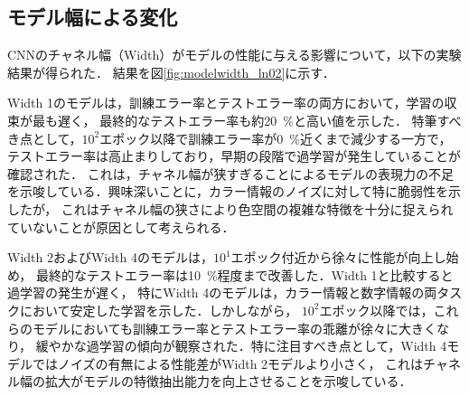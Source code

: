 \newpage

\subsection{モデル幅による変化}

CNNのチャネル幅（Width）がモデルの性能に与える影響について，以下の実験結果が得られた．
結果を図\ref{fig:modelwidth_ln02}に示す．

Width 1のモデルは，訓練エラー率とテストエラー率の両方において，学習の収束が最も遅く，
最終的なテストエラー率も約\SI{20}{\percent}と高い値を示した．
特筆すべき点として，$10^2$エポック以降で訓練エラー率が\SI{0}{\percent}近くまで減少する一方で，
テストエラー率は高止まりしており，早期の段階で過学習が発生していることが確認された．
これは，チャネル幅が狭すぎることによるモデルの表現力の不足を示唆している．興味深いことに，カラー情報のノイズに対して特に脆弱性を示したが，
これはチャネル幅の狭さにより色空間の複雑な特徴を十分に捉えられていないことが原因として考えられる．

Width 2およびWidth 4のモデルは，$10^1$エポック付近から徐々に性能が向上し始め，
最終的なテストエラー率は\SI{10}{\percent}程度まで改善した．Width 1と比較すると過学習の発生が遅く，
特にWidth 4のモデルは，カラー情報と数字情報の両タスクにおいて安定した学習を示した．しかしながら，
$10^2$エポック以降では，これらのモデルにおいても訓練エラー率とテストエラー率の乖離が徐々に大きくなり，
緩やかな過学習の傾向が観察された．特に注目すべき点として，Width 4モデルではノイズの有無による性能差がWidth 2モデルより小さく，
これはチャネル幅の拡大がモデルの特徴抽出能力を向上させることを示唆している．

